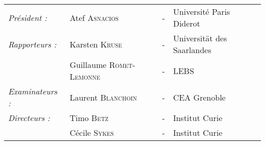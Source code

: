 \begin{center}
\begin{minipage}{0.75\linewidth}
\begin{center}
            \end{center}
            \begin{center}
            \noindent \large 
            \begin{tabular}{llcl}
                \textit{Président :}    & Atef            \textsc{Asnacios }       & - & Université Paris Diderot \\
                \textit{Rapporteurs :}  & Karsten \textsc{Kruse}           & - & Universität des Saarlandes \\
                                        & Guillaume         \textsc{Romet-Lemonne}   & - & LEBS\\
                            
                \textit{Examinateurs :} & Laurent           \textsc{Blanchoin}       & - & CEA Grenoble\\
                \textit{Directeurs : }  & Timo              \textsc{Betz}            & - & Institut Curie\\
                                        & Cécile          \textsc{Sykes}           & - & Institut Curie\\
                            
            \end{tabular}
            \end{center}
        \end{minipage}
    \end{center}
    \clearpage
    \null
    \thispagestyle{empty}%
    \addtocounter{page}{-1}%
    \newpage

